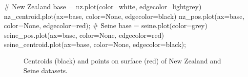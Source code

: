 \documentclass[
  letterpaper,
]{krantz}
\newenvironment{Shaded}{\begin{snugshade}}{\end{snugshade}}
\newcommand{\CommentTok}[1]{\textcolor[rgb]{0.37,0.37,0.37}{#1}}
\newcommand{\NormalTok}[1]{\textcolor[rgb]{0.00,0.23,0.31}{#1}}
\newcommand{\OperatorTok}[1]{\textcolor[rgb]{0.37,0.37,0.37}{#1}}
\newcommand{\StringTok}[1]{\textcolor[rgb]{0.13,0.47,0.30}{#1}}
\begin{document}
\begin{Shaded}
\begin{Highlighting}[]
\CommentTok{\# New Zealand}
\NormalTok{base }\OperatorTok{=}\NormalTok{ nz.plot(color}\OperatorTok{=}\StringTok{\textquotesingle{}white\textquotesingle{}}\NormalTok{, edgecolor}\OperatorTok{=}\StringTok{\textquotesingle{}lightgrey\textquotesingle{}}\NormalTok{)}
\NormalTok{nz\_centroid.plot(ax}\OperatorTok{=}\NormalTok{base, color}\OperatorTok{=}\StringTok{\textquotesingle{}None\textquotesingle{}}\NormalTok{, edgecolor}\OperatorTok{=}\StringTok{\textquotesingle{}black\textquotesingle{}}\NormalTok{)}
\NormalTok{nz\_pos.plot(ax}\OperatorTok{=}\NormalTok{base, color}\OperatorTok{=}\StringTok{\textquotesingle{}None\textquotesingle{}}\NormalTok{, edgecolor}\OperatorTok{=}\StringTok{\textquotesingle{}red\textquotesingle{}}\NormalTok{)}\OperatorTok{;}
\CommentTok{\# Seine}
\NormalTok{base }\OperatorTok{=}\NormalTok{ seine.plot(color}\OperatorTok{=}\StringTok{\textquotesingle{}grey\textquotesingle{}}\NormalTok{)}
\NormalTok{seine\_pos.plot(ax}\OperatorTok{=}\NormalTok{base, color}\OperatorTok{=}\StringTok{\textquotesingle{}None\textquotesingle{}}\NormalTok{, edgecolor}\OperatorTok{=}\StringTok{\textquotesingle{}red\textquotesingle{}}\NormalTok{)}
\NormalTok{seine\_centroid.plot(ax}\OperatorTok{=}\NormalTok{base, color}\OperatorTok{=}\StringTok{\textquotesingle{}None\textquotesingle{}}\NormalTok{, edgecolor}\OperatorTok{=}\StringTok{\textquotesingle{}black\textquotesingle{}}\NormalTok{)}\OperatorTok{;}
\end{Highlighting}
\end{Shaded}

\begin{figure}

\begin{minipage}{0.50\linewidth}



\end{minipage}%
%
\begin{minipage}{0.50\linewidth}



\end{minipage}%

\caption{\label{fig-centroid-pnt-on-surface}Centroids (black) and points
on surface (red) of New Zealand and Seine datasets.}

\end{figure}%
\end{document}
